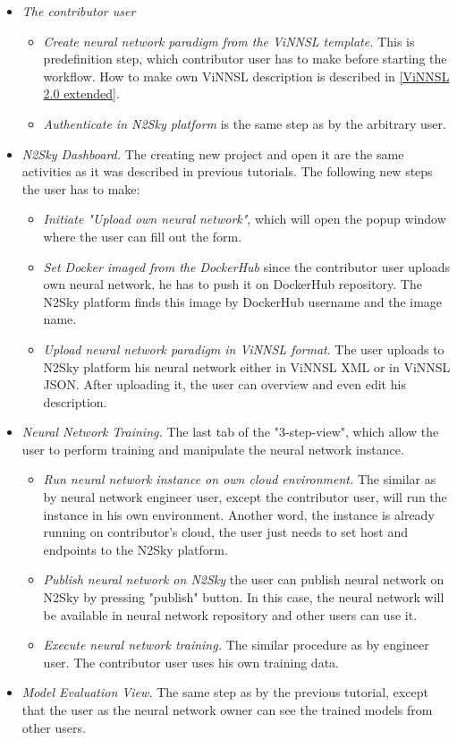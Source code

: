 \begin{itemize}
\item \emph{The contributor user} 
\begin{itemize}
\item \emph{Create neural network paradigm from the ViNNSL template.} This is predefinition step, which contributor user has to make before starting the workflow. How to make own ViNNSL description is described in \autoref{ViNNSL 2.0 extended}.
\item \emph{Authenticate in N2Sky platform} is the same step as by the arbitrary user.
\end{itemize}
\item \emph{N2Sky Dashboard.} The creating new project and open it are the same activities as it was described in previous tutorials. The following new steps the user has to make:
\begin{itemize}
\item \emph{Initiate "Upload own neural network"}, which will open the popup window where the user can fill out the form.
\item \emph{Set Docker imaged from the DockerHub} since the contributor user uploads own neural network, he has to push it on DockerHub repository. The N2Sky platform finds this image by DockerHub username and the image name.
\item \emph{Upload neural network paradigm in ViNNSL format}. The user uploads to N2Sky platform his neural network either in ViNNSL XML or in ViNNSL JSON. After uploading it, the user can overview and even edit his description.
\end{itemize}
\item \emph{Neural Network Training.} The last tab of the "3-step-view", which allow the user to perform training and manipulate the neural network instance.
\begin{itemize}
\item \emph{Run neural network instance on own cloud environment.} The similar as by neural network engineer user, except the contributor user, will run the instance in his own environment. Another word, the instance is already running on contributor's cloud, the user just needs to set host and endpoints to the N2Sky platform.
\item \emph{Publish neural network on N2Sky} the user can publish neural network on N2Sky by pressing "publish" button. In this case, the neural network will be available in neural network repository and other users can use it.
\item \emph{Execute neural network training.} The similar procedure as by engineer user. The contributor user uses his own training data.
\end{itemize}
\item \emph{Model Evaluation View.} The same step as by the previous tutorial, except that the user as the neural network owner can see the trained models from other users.

\end{itemize}

